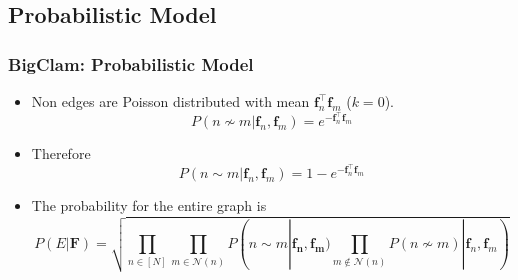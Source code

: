 \documentclass{beamer}
\begin{document}
\subsection{Probabilistic Model}
\begin{frame}
\frametitle{BigClam: Probabilistic Model}
\begin{itemize}[itemsep=1em, label=\textbullet]
        
        


        
        \item Non edges are Poisson distributed with mean
        $\mathbf{f}_n^\top \mathbf{f}_m$ ($k=0$). 
         \[P(n \not \sim m | \mathbf{f}_n, \mathbf{f}_m) = e^{-\mathbf{f}_n^\top \mathbf{f}_m}\]%
         \item Therefore
         \[P(n\sim m| \mathbf{f}_n, \mathbf{f}_m) = 1 - e^{-\mathbf{f}_n^\top \mathbf{f}_m}\]%

         \item The probability for the entire graph is
         \[ P(E|\mathbf{F}) = \sqrt{\prod_{n \in [N]}\prod_{m \in \mathcal{N}(n)}P( n\sim m|\mathbf{\mathbf{f}_n, \mathbf{f}_m})\prod_{m \notin \mathcal{N}(n)} P( n\not\sim m)|\mathbf{f}_n, \mathbf{f}_m)}\]%
\end{itemize}

    
\end{frame}
\end{document}
